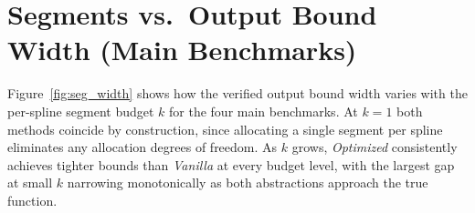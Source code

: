 \section{Segments vs.\ Output Bound Width (Main Benchmarks)}\label{app:seg-width-main}

Figure~\ref{fig:seg_width} shows how the verified output bound width varies with the per-spline segment budget $k$ for the four main benchmarks. At $k=1$ both methods coincide by construction, since allocating a single segment per spline eliminates any allocation degrees of freedom. As $k$ grows, \emph{Optimized} consistently achieves tighter bounds than \emph{Vanilla} at every budget level, with the largest gap at small $k$ narrowing monotonically as both abstractions approach the true function.

